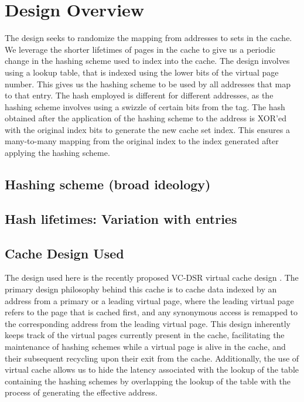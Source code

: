 \section{Design Overview}
The design seeks to randomize the mapping from addresses to sets in the cache. We leverage the shorter lifetimes of pages in the cache to give us a periodic change in the hashing scheme used to index into the cache. The design involves using a lookup table, that is indexed using the lower bits of the virtual page number. This gives us the hashing scheme to be used by all addresses that map to that entry. The hash employed is different for different addresses, as the hashing scheme involves using a swizzle of certain bits from the tag. The hash obtained after the application of the hashing scheme to the address is XOR'ed with the original index bits to generate the new cache set index. This ensures a many-to-many mapping from the original index to the index generated after applying the hashing scheme. 
\subsection{Hashing scheme (broad ideology)}
\subsection{Hash lifetimes: Variation with entries}
\subsection{Cache Design Used}
The design used here is the recently proposed VC-DSR virtual cache design \cite{}. The primary design philosophy behind this cache is to cache data indexed by an address from a primary or a leading virtual page, where the leading virtual page refers to the page that is cached first, and any synonymous access is remapped to the corresponding address from the leading virtual page.  This design inherently keeps track of the virtual pages currently present in the cache, facilitating the maintenance of hashing schemes while a virtual page is alive in the cache, and their subsequent recycling upon their exit from the cache. Additionally, the use of virtual cache allows us to hide the latency associated with the lookup of the table containing the hashing schemes by overlapping the lookup of the table with the process of generating the effective address. 

